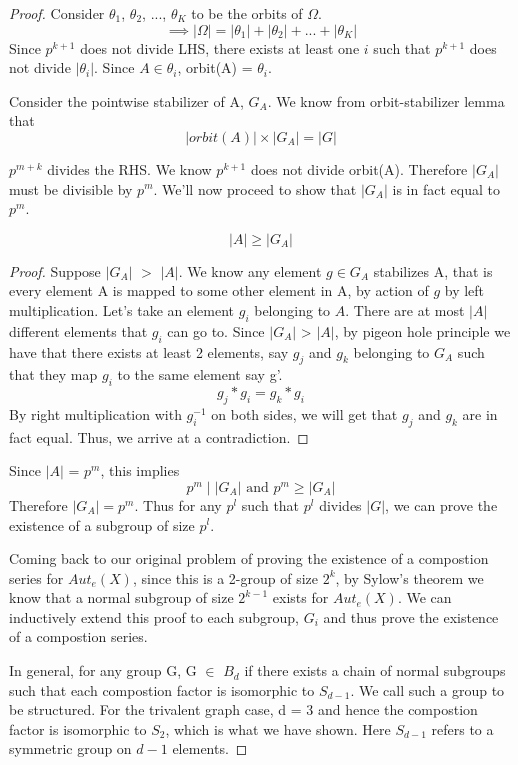 \begin{proof}
Consider $\theta_{1}$, $\theta_{2}$, ..., $\theta_{K}$ to be the orbits of $\Omega$.
\[ \implies |\Omega| = |\theta_{1}| + |\theta_{2}| + ... + |\theta_{K}| \]
Since $p^{k+1}$ does not divide LHS, there exists at least one $i$ such that $p^{k+1}$ does not divide $|\theta_{i}|$. Since $A \in \theta_{i}$, orbit(A) = $\theta_{i}$.

Consider the pointwise stabilizer of A, $G_{A}$. We know from orbit-stabilizer lemma that
\[ |orbit(A)| \times |G_{A}| = |G| \]

$p^{m+k}$ divides the RHS. We know $p^{k+1}$ does not divide orbit(A). Therefore $|G_{A}|$ must be divisible by $p^{m}$. We'll now proceed to show that $|G_{A}|$ is in fact equal to $p^{m}$.

\begin{claim}
\[ |A| \geq |G_{A}| \]
\end{claim}

\begin{proof}
Suppose $|G_{A}|$ $>$ $|A|$. We know any element $g \in G_{A}$ stabilizes A, that is every element A is mapped to some other element in A, by action of $g$ by left multiplication. Let's take an element $g_{i}$ belonging to $A$. There are at most $|A|$ different elements that $g_{i}$ can go to. Since $|G_{A}|$ > $|A|$, by pigeon hole principle we have that there exists at least 2 elements, say $g_{j}$ and $g_{k}$ belonging to $G_{A}$ such that they map $g_{i}$ to the same element say g'.
\[ g_{j} * g_{i} = g_{k} * g_{i} \]
By right multiplication with $g_{i}^{-1}$ on both sides, we will get that $g_{j}$ and $g_{k}$ are in fact equal. Thus, we arrive at a contradiction.
\end{proof}

Since $|A|$ = $p^{m}$, this implies
\[ p^{m} \; | \; |G_{A}| \text{ and } p^m \geq |G_{A}| \]
Therefore $|G_{A}| = p^{m}$. Thus for any $p^{l}$ such that $p^{l}$ divides $|G|$, we can prove the existence of a subgroup of size $p^{l}$.

Coming back to our original problem of proving the existence of a compostion series for $Aut_{e}(X)$, since this is a 2-group of size $2^{k}$, by Sylow's theorem we know that a normal subgroup of size $2^{k-1}$ exists for $Aut_{e}(X)$. We can inductively extend this proof to each subgroup, $G_{i}$ and thus prove the existence of a compostion series.

In general, for any group G, G $\in$ $B_{d}$ if there exists a chain of normal subgroups such that each compostion factor is isomorphic to $S_{d-1}$. We call such a group to be structured. For the trivalent graph case, d = 3 and hence the compostion factor is isomorphic to $S_{2}$, which is what we have shown. Here $S_{d-1}$ refers to a symmetric group on $d - 1$ elements.
\end{proof}

